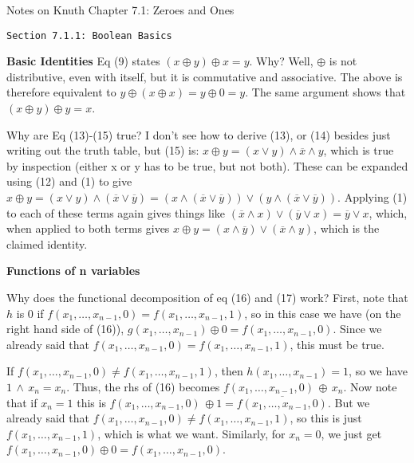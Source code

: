 \topglue 0.5in
\centerline{Notes on Knuth Chapter 7.1: Zeroes and Ones}
\vskip 0.3in
\centerline{\tt Section 7.1.1: Boolean Basics}
\vskip 0.2in

\noindent
{\bf Basic Identities} \hfil\break
\vskip 0.05in
\noindent [p 50] Eq (9) states $\left( x \oplus y \right)
\oplus x = y$.  Why?  \hfil\break
Well, $\oplus$ is not distributive, even with itself,
but it is commutative and associative. The above is therefore
equivalent to $y \oplus \left( x \oplus x \right) = y \oplus 0 = y$.
The same argument shows that $\left( x \oplus y \right) \oplus y = x$.

\vskip 0.05in
\noindent [p 51] Why are Eq (13)-(15) true? \hfil\break
I don't see how to derive (13), or (14) besides just writing out the truth table, but (15) is:
$x \oplus y = \left(x \vee y\right) \wedge \overline x \wedge y$, which
is true by inspection (either x or y has to be true, but not both).
These can be expanded using (12) and (1) to give
$x \oplus y = \left(x \vee y\right) \wedge \left(\overline{x} \vee \overline{y}
\right) = \left(x \wedge \left(\overline{x} \vee \overline{y}\right)\right)
\vee \left(y \wedge \left(\overline{x} \vee \overline{y}\right)\right)$.
Applying (1) to each of these terms again gives things like
$\left(\overline{x} \wedge x\right) \vee \left(\overline{y} \vee x\right) =
\overline{y} \vee x$, which, when applied to both terms gives
$x \oplus y = \left(x \wedge \overline{y}\right) \vee \left(\overline{x}
\wedge y\right)$, which is the claimed identity.

\vskip 0.1in
\noindent
{\bf Functions of n variables} \hfil\break

\noindent [p51] Why does the functional decomposition
of eq (16) and (17) work? \hfil\break
First, note that $h$ is 0 if
$f\left(x_1,\ldots,x_{n-1},0\right) = f\left( x_1,\ldots,x_{n-1},1\right)$, so
in this case we have (on the right hand side of (16)),
 $g\left(x_1,\ldots,x_{n-1}\right) \oplus 0 = f\left(x_1,\ldots,x_{n-1},0\right)$.
 Since we already said that $f\left(x_1,\ldots,x_{n-1},0\right) = f\left( x_1,\ldots,x_{n-1},1\right)$, this must be true.  
 
If $f\left(x_1,\ldots,x_{n-1},0\right) \neq f\left( x_1,\ldots,x_{n-1},1\right)$,
then $h\left(x_1,\ldots,x_{n-1}\right)=1$, so we have $1\, \wedge\, x_n
= x_n$.  Thus, the rhs of (16) becomes $f\left(x_1,\ldots,x_{n-1},0\right) 
\, \oplus \, x_n$.  Now note that if $x_n = 1$ this is
$f\left(x_1,\ldots,x_{n-1},0\right) \, \oplus 1 = 
\overline{f\left(x_1,\ldots,x_{n-1},0\right)}$.  But we already said that
$f\left(x_1,\ldots,x_{n-1},0\right) \neq f\left( x_1,\ldots,x_{n-1},1\right)$,
so this is just $f\left(x_1,\ldots,x_{n-1},1\right)$, which is what we want.
Similarly, for $x_n = 0$, we just get
$f\left(x_1,\ldots,x_{n-1},0\right) \oplus 0 = f\left(x_1,\ldots,x_{n-1},0\right)$.

